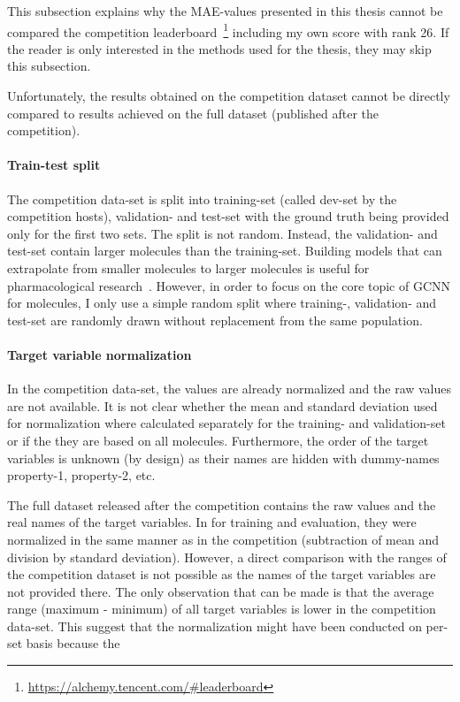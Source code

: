 This subsection explains why the MAE-values presented in this thesis cannot be compared the competition leaderboard~\footnote{\url{https://alchemy.tencent.com/\#leaderboard}} including my own score with rank 26. If the reader is only interested in the methods used for the thesis, they may skip this subsection.

Unfortunately, the results obtained on the competition dataset cannot be directly compared to results achieved on the full dataset (published after the competition).

\paragraph{Train-test split}
The competition data-set is split into training-set (called dev-set by the competition hosts), validation- and test-set with the ground truth being provided only for the first two sets. The split is not random. Instead, the validation- and test-set contain larger molecules than the training-set. Building models that can extrapolate from smaller molecules to larger molecules is useful for pharmacological research~\cite{Chen2019}. However, in order to focus on the core topic of GCNN for molecules, I only use a simple random split where training-, validation- and test-set are randomly drawn without replacement from the same population.

\paragraph{Target variable normalization}

In the competition data-set, the values are already normalized and the raw values are not available. It is not clear whether the mean and standard deviation used for normalization where calculated separately for the training- and validation-set or if the they are based on all molecules. Furthermore, the order of the target variables is unknown (by design) as their names are hidden with dummy-names property-1, property-2, etc.

The full dataset released after the competition contains the raw values and the real names of the target variables. In for training and evaluation, they were normalized in the same manner as in the competition (subtraction of mean and division by standard deviation). However, a direct comparison with the ranges of the competition dataset is not possible as the names of the target variables are not provided there. The only observation that can be made is that the average range (maximum - minimum) of all target variables is lower in the competition data-set. This suggest that the normalization might have been conducted on per-set basis because the 


